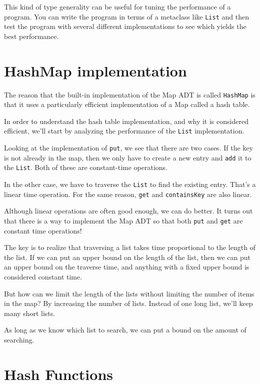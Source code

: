 This kind of type generality can be useful for tuning
the performance of a program.  You can write the program in
terms of a metaclass like {\tt List} and then test the
program with several different implementations to see which
yields the best performance.


\section{HashMap implementation}

The reason that the built-in implementation of the Map ADT
is called {\tt HashMap} is that it uses a particularly efficient
implementation of a Map called a hash table.

In order to understand the hash table implementation, and why it is
considered efficient, we'll start by analyzing the performance of the
{\tt List} implementation.

Looking at the implementation of {\tt put}, we see that there are
two cases.  If the key is not already in the map, then we
only have to create a new entry and {\tt add} it to
the {\tt List}.  Both of these are constant-time operations.

In the other case, we have to traverse the {\tt List} to find
the existing entry.  That's a linear time operation.
For the same reason, {\tt get} and {\tt containsKey} are also
linear.

Although linear operations are often good enough, we can do
better.  It turns out that there is a way to implement the
Map ADT so that both {\tt put} and {\tt get} are constant time
operations!

The key is to realize that traversing a list takes time
proportional to the length of the list.  If we can put an upper
bound on the length of the list, then we can put an upper
bound on the traverse time, and anything with a fixed upper
bound is considered constant time.


But how can we limit the length of the lists without limiting
the number of items in the map?  By increasing the number
of lists.  Instead of one long list, we'll keep many short
lists.

As long as we know which list to search, we can put a bound
on the amount of searching.


\section{Hash Functions}

